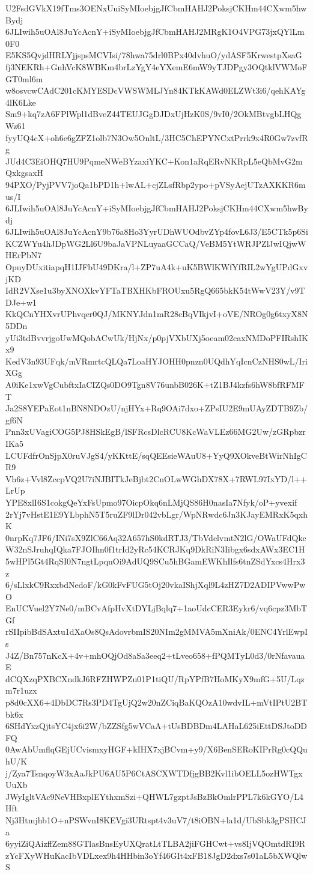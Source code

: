 U2FsdGVkX19fTms3OENxUuiSyMIoebjgJfCbmHAHJ2PoksjCKHm44CXwm5hwBydj
6JLIwih5uOAl8JuYcAcnY+iSyMIoebjgJfCbmHAHJ2MRgK1O4VPG73jxQYlLm0F0
E5KS5QvjdHRLYjjspsMCVIsi/78hwa75drl0BPx40dvhuO/ydASF5KrwestpXsaG
fj3NEKRh+GnhVcK8WBKm4brLzYgY4eYXemE6mW9yTJDPgy3OQtklVWMoFGT0ml6m
w8osvcwCAdC201cKMYESDcVWSWMLJYn84KTkKAWd0ELZWt3i6/qehKAYg4lK6Lke
Sm9+kq7zA6FPlWpl1dBveZ44TEUJGgDJDxUjHzK0S/9vI0/2OkMBtvgbLHQgWz61
fyyUQ4cX+oh6e6gZFZ1olb7N3Ow5OnltL/3HC5ChEPYNCxtPrrk9x4R0Gw7zvfRg
JUd4C3EiOHQ7HU9PqmeNWeBYzaxiYKC+Kon1aRqERvNKRpL5eQbMvG2mQxkgsaxH
94PXO/PyjPVV7joQa1bPD1h+lwAL+cjZLsfRbp2ypo+pVSyAejUTzAXKKR6mus/I
6JLIwih5uOAl8JuYcAcnY+iSyMIoebjgJfCbmHAHJ2PoksjCKHm44CXwm5hwBydj
6JLIwih5uOAl8JuYcAcnY9b76a8Ho3YyrUDhWUOdbvZYp4fovL6J3/E5CTk5p6Si
KCZWYu4hJDpWG2Ll6U9baJaVPNLuyaaGCCaQ/VeBM5YtWRJPZlJwIQjwWHErPbN7
OpuyDUxitiapqH1IJFbU49DKra/l+ZP7uA4k+uK5BWlKWfYfRIL2wYgUPdGxvjKD
IdR2VXse1u3byXNOXkvYFTaTBXHKbFROUxu5RgQ665bkK54tWwV23Y/v9TDJe+w1
KkQCnYHXvrUPhvqer0QJ/MKNYJdn1mR28cBqVIkjvI+oVE/NROg0g6txyX8N5DDn
yUi3tdBvvrjgoUwMQobACwUk/HjNx/p0pjVXbUXj5oeam02caxNMDoPFIRshIKx9
KedV3n93UFqk/mVRmrtcQLQa7LoaHYJOHH0pnzn0UQdhYqIcnCzNHS0wL/IriXGg
A0iKe1xwVgCubftxIaCIZQs0DO9Tgn8V76unbB026K+tZ1BJ4kzfs6hW8bfRFMFT
Ja2S8YEPaEot1nBN8NDOzU/njHYx+Rq9OAi7dxo+ZPsIU2E9mUAyZDTB9Zb/gf6N
Pnn3xUVagiCOG5PJ8HSkEgB/lSFRcsDlcRCU8KcWaVLEz66MG2Uw/zGRpbzrIKa5
LCUFdfrOnSjpX0ruVJgS4/yKKttE/sqQEEsieWAuU8+YyQ9XOkveBtWirNhIgCR9
Vh6z+Vvl8ZccpVQ2U7iNJBITkJeBjbt2CnOLwWGhDX78X+7RWL97IxYD/l++LrUp
YPE8xlI6S1cokgQeYxFsUpmo97OicpOkq6nLMjQS86H0nasIa7Nfyk/oP+yvexif
2rYj7vHstE1E9YLbphN5T5ruZF9lDr042vbLgr/WpNRwdc6Jn3KJayEMRxK5qxhK
0nrpKq7JF6/INi7sX9ZlC66Aq32A657hS0kdRTJ3/TbVdelvmtN2lG/OWaUFdQkc
W32nSJruhqIQka7FJOIhn0f1trId2yRc54KCRJKq9DkRiN3Iibgx6sdxAWx3EC1H
5wHPl5Gt4RqSI0N7ngtLpquOi9AdUQ9SCu5hBGamEWKhIlfs6tnZSdYxcs4Hrx3z
6/sLlxkC9RxxbdNedoF/kG0kFvFUG5tOj20vkaIShjXql9L4zHZ7D2ADIPVwwPwO
EnUCVuel2Y7Ne0/mBCvAfpHvXtDYLjBqlq7+1aoUdcCER3Eykr6/vq6cpz3MbTGf
rSIIpibBdSAxtu1dXaOs8QsAdovrbmIS20NIm2gMMVA5mXniAk/0ENC4YrlEwpIs
J4Z/Bn757nKcX+4v+mhOQjOd8aSa3eeq2+tLveo658+fPQMTyL0d3/0rNfavauaE
dCQXzqPXBCXndkJ6RFZHWPZu01P1tiQU/RpYPfB7HoMKyX9mfG+5U/Lqzm7r1uzx
p8d0cXX6+4DbDC7Rs3PD4TgUjQ2w20nZCiqBaKQOzA10wdvIL+mVtIPtU2BTbk6x
6SHdYxzQjtsYC4jx6i2W/bZZSfg5wVCaA+tUsBDBDm4LAHaL625iEttDSJtoDDFQ
0AwAbUmflqGEjUCvismxyHGF+kIHX7xjBCvm+y9/X6BenSERoKIPrRg0cQQuhU/K
j/Zya7TsnqoyW3xAaJkPU6AU5P6CtASCXWTDfjgBB2Kvl1ibOELL5ozHWTgxUuXb
JWyIgltVAc9NeVHBxplEYthxmSzi+QHWL7gzptJsBzBkOmlrPPL7k6kGYO/L4Hft
Nj3Htmjhb1O+nPSWvnI8KEVgi3URtspt4v3uV7/t8iOBN+la1d/UbSbk3gPSHCJa
6yyiZiQAizffZem88GTlasBnsEyUXQratLtTLBA2jiFGHCwt+vs8IjVQOmtdRI9R
zYcFXyWHuKacIbVDLxex9h4HHbin3oYf46GIt4xFB18JgD2dxs7s01aL5bXWQlwS
